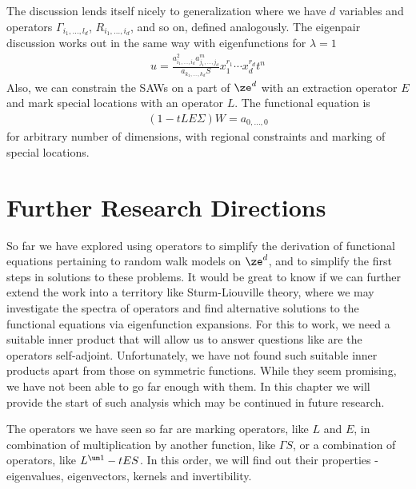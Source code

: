 \begin{example}
The discussion lends itself nicely to generalization where we have $d$ variables and operators $\Gamma_{i_1,\ldots,l_d}$, $R_{i_1,\ldots,i_d}$, and so on, defined analogously. The eigenpair discussion works out in the same way with eigenfunctions for $\lambda = 1$
\begin{align}
	u = \frac{a_{i_1,\ldots,i_d}^2 a_{j_1,\ldots,j_d}^m}{a_{k_1,\ldots,k_d}S}x_1^{r_1}\cdots x_d^{r_d} t^n
\end{align}
Also, we can constrain the SAWs on a part of $\ze^d$ with an extraction operator $E$ and mark special locations with an operator $L$. The functional equation is
\begin{align}
	(1- tLE\Sigma)W = a_{0,\ldots,0}
\end{align}
for arbitrary number of dimensions, with regional constraints and marking of special locations.
\end{example}

\section{Further Research Directions}

So far we have explored using operators to simplify the derivation of functional equations pertaining to random walk models on $\ze^d$, and to simplify the first steps in solutions to these problems. It would be great to know if we can further extend the work into a territory like Sturm-Liouville theory, where we may investigate the spectra of operators and find alternative solutions to the functional equations via eigenfunction expansions. For this to work, we need a suitable inner product that will allow us to answer questions like are the operators self-adjoint. Unfortunately, we have not found such suitable inner products apart from those on symmetric functions. While they seem promising, we have not been able to go far enough with them. In this chapter we will provide the start of such analysis which may be continued in future research.

The operators we have seen so far are marking operators, like $L$ and $E$, in combination of multiplication by another function, like $\Gamma S$, or a combination of operators, like $L^{\um 1} - tES$. In this order, we will find out their properties - eigenvalues, eigenvectors, kernels and invertibility.


